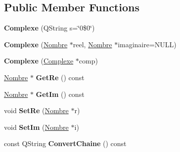 \subsection*{Public Member Functions}
\begin{DoxyCompactItemize}
\item 
\hypertarget{class_calcul_1_1_complexe_a339a3e1127659228bb342a3e83433927}{{\bfseries Complexe} (Q\-String s=\char`\"{}0\$0\char`\"{})}\label{class_calcul_1_1_complexe_a339a3e1127659228bb342a3e83433927}

\item 
\hypertarget{class_calcul_1_1_complexe_ad47a4a48e44aa777f6e598f8221dea42}{{\bfseries Complexe} (\hyperlink{class_calcul_1_1_nombre}{Nombre} $\ast$reel, \hyperlink{class_calcul_1_1_nombre}{Nombre} $\ast$imaginaire=N\-U\-L\-L)}\label{class_calcul_1_1_complexe_ad47a4a48e44aa777f6e598f8221dea42}

\item 
\hypertarget{class_calcul_1_1_complexe_a042ce33da08cb71e717ac3b67e6c964b}{{\bfseries Complexe} (\hyperlink{class_calcul_1_1_complexe}{Complexe} $\ast$comp)}\label{class_calcul_1_1_complexe_a042ce33da08cb71e717ac3b67e6c964b}

\item 
\hypertarget{class_calcul_1_1_complexe_acb9136f710db8d1d83a5a25d76fb6dfe}{\hyperlink{class_calcul_1_1_nombre}{Nombre} $\ast$ {\bfseries Get\-Re} () const }\label{class_calcul_1_1_complexe_acb9136f710db8d1d83a5a25d76fb6dfe}

\item 
\hypertarget{class_calcul_1_1_complexe_a07757377f6a1de6afd6364edb00784b7}{\hyperlink{class_calcul_1_1_nombre}{Nombre} $\ast$ {\bfseries Get\-Im} () const }\label{class_calcul_1_1_complexe_a07757377f6a1de6afd6364edb00784b7}

\item 
\hypertarget{class_calcul_1_1_complexe_af544268718f1709a2ff534210051442c}{void {\bfseries Set\-Re} (\hyperlink{class_calcul_1_1_nombre}{Nombre} $\ast$r)}\label{class_calcul_1_1_complexe_af544268718f1709a2ff534210051442c}

\item 
\hypertarget{class_calcul_1_1_complexe_a14ba5f590705435810d24d29e59b1012}{void {\bfseries Set\-Im} (\hyperlink{class_calcul_1_1_nombre}{Nombre} $\ast$i)}\label{class_calcul_1_1_complexe_a14ba5f590705435810d24d29e59b1012}

\item 
\hypertarget{class_calcul_1_1_complexe_a3f444d3a18104aeb6f1490c0d3a57e6d}{const Q\-String {\bfseries Convert\-Chaine} () const }\label{class_calcul_1_1_complexe_a3f444d3a18104aeb6f1490c0d3a57e6d}


\end{DoxyCompactItemize}
